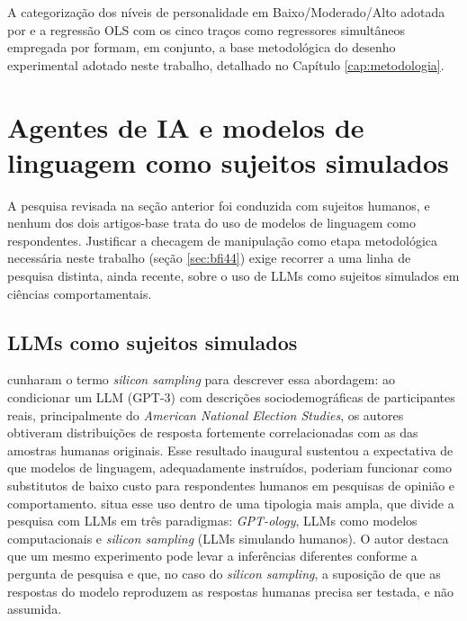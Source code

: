 A categorização dos níveis de personalidade em Baixo/Moderado/Alto
adotada por  e a regressão OLS com os cinco
traços como regressores simultâneos empregada por
 formam, em conjunto, a base metodológica do
desenho experimental adotado neste trabalho, detalhado no Capítulo
\ref{cap:metodologia}.

\section{Agentes de IA e modelos de linguagem como sujeitos simulados}

A pesquisa revisada na seção anterior foi conduzida com sujeitos humanos,
e nenhum dos dois artigos-base trata do uso de modelos de linguagem como
respondentes. Justificar a checagem de manipulação como etapa
metodológica necessária neste trabalho (seção \ref{sec:bfi44}) exige
recorrer a uma linha de pesquisa
distinta, ainda recente, sobre o uso de LLMs como sujeitos simulados em
ciências comportamentais.

\subsection{LLMs como sujeitos simulados}

 cunharam o termo \textit{silicon sampling} para
descrever essa abordagem: ao condicionar um LLM (GPT-3) com descrições
sociodemográficas de participantes reais, principalmente do
\textit{American National Election Studies}, os autores obtiveram
distribuições de resposta fortemente correlacionadas com as das amostras
humanas originais. Esse resultado inaugural sustentou a expectativa de
que modelos de linguagem, adequadamente instruídos, poderiam funcionar
como substitutos de baixo custo para respondentes humanos em pesquisas de
opinião e comportamento.  situa esse uso dentro de
uma tipologia mais ampla, que divide a pesquisa com LLMs em três
paradigmas: \textit{GPT-ology}, LLMs como modelos computacionais e
\textit{silicon sampling} (LLMs simulando humanos). O autor destaca que
um mesmo experimento pode levar a inferências diferentes conforme a
pergunta de pesquisa e que, no caso do \textit{silicon sampling}, a
suposição de que as respostas do modelo reproduzem as respostas humanas
precisa ser testada, e não assumida.

